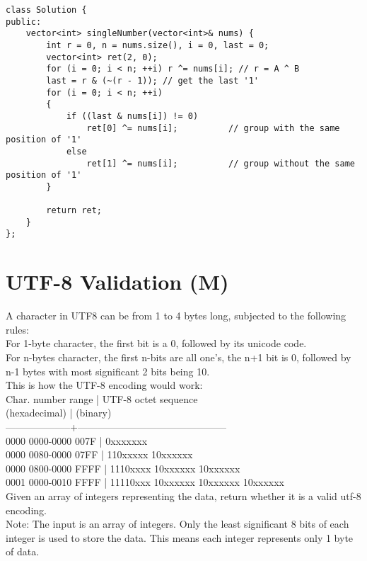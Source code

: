 \begin{lstlisting}
class Solution {
public:
    vector<int> singleNumber(vector<int>& nums) {
        int r = 0, n = nums.size(), i = 0, last = 0;
        vector<int> ret(2, 0);
        for (i = 0; i < n; ++i) r ^= nums[i]; // r = A ^ B
        last = r & (~(r - 1)); // get the last '1'
        for (i = 0; i < n; ++i)
        {
            if ((last & nums[i]) != 0)
                ret[0] ^= nums[i];          // group with the same position of '1'
            else
                ret[1] ^= nums[i];          // group without the same position of '1'
        }

        return ret;
    }
};
\end{lstlisting}


\section{UTF-8 Validation (M)}
A character in UTF8 can be from 1 to 4 bytes long, subjected to the following rules:\\
    For 1-byte character, the first bit is a 0, followed by its unicode code.\\
    For n-bytes character, the first n-bits are all one's, the n+1 bit is 0, followed by n-1 bytes with most significant 2 bits being 10.\\

This is how the UTF-8 encoding would work:\\
   Char. number range  |        UTF-8 octet sequence\\
      (hexadecimal)    |              (binary)\\
   --------------------+---------------------------------------------\\
   0000 0000-0000 007F | 0xxxxxxx\\
   0000 0080-0000 07FF | 110xxxxx 10xxxxxx\\
   0000 0800-0000 FFFF | 1110xxxx 10xxxxxx 10xxxxxx\\
   0001 0000-0010 FFFF | 11110xxx 10xxxxxx 10xxxxxx 10xxxxxx\\

Given an array of integers representing the data, return whether it is a valid utf-8 encoding.\\

Note:
The input is an array of integers. Only the least significant 8 bits of each integer is used to store the data. This means each integer represents only 1 byte of data.\\

